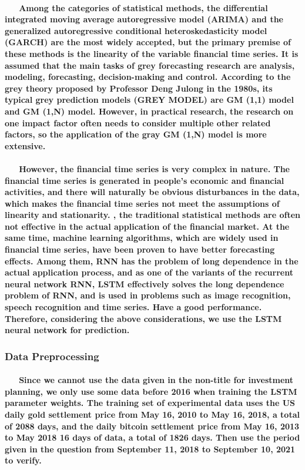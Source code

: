 \documentclass{mcmthesis}
\begin{document}
	\paragraph{\ \ \ Among the categories of statistical methods, the differential integrated moving average autoregressive model (ARIMA) and the generalized autoregressive conditional heteroskedasticity model (GARCH) are the most widely accepted, but the primary premise of these methods is the linearity of the variable financial time series. It is assumed that the main tasks of grey forecasting research are analysis, modeling, forecasting, decision-making and control. According to the grey theory proposed by Professor Deng Julong in the 1980s, its typical grey prediction models (GREY MODEL) are GM (1,1) model and GM (1,N) model. However, in practical research, the research on one impact factor often needs to consider multiple other related factors, so the application of the gray GM (1,N) model is more extensive.}
	\paragraph{\ \ \ However, the financial time series is very complex in nature. The financial time series is generated in people's economic and financial activities, and there will naturally be obvious disturbances in the data, which makes the financial time series not meet the assumptions of linearity and stationarity. , the traditional statistical methods are often not effective in the actual application of the financial market. At the same time, machine learning algorithms, which are widely used in financial time series, have been proven to have better forecasting effects. Among them, RNN has the problem of long dependence in the actual application process, and as one of the variants of the recurrent neural network RNN, LSTM effectively solves the long dependence problem of RNN, and is used in problems such as image recognition, speech recognition and time series. Have a good performance. Therefore, considering the above considerations, we use the LSTM neural network for prediction.}
	\subsubsection{Data Preprocessing}
	\paragraph{\ \ \ Since we cannot use the data given in the non-title for investment planning, we only use some data before 2016 when training the LSTM parameter weights. The training set of experimental data uses the US daily gold settlement price from May 16, 2010 to May 16, 2018, a total of 2088 days, and the daily bitcoin settlement price from May 16, 2013 to May 2018 16 days of data, a total of 1826 days. Then use the period given in the question from September 11, 2018 to September 10, 2021 to verify.}
\end{document}
